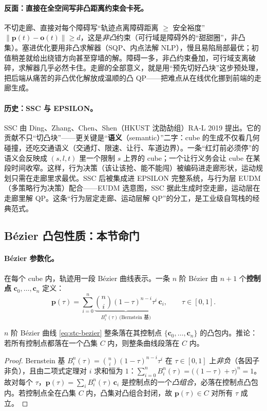 \paragraph{反面：直接在全空间写非凸距离约束会卡死。}
不切走廊、直接对每个障碍写“轨迹点离障碍距离 $\ge$ 安全裕度” $\|\mathbf{p}(t)-\mathbf{o}(t)\|\ge d$，这是\emph{非凸}约束（可行域是障碍外的“甜甜圈”，非凸集）。塞进优化要用非凸求解器（SQP、内点法解 NLP），慢且易陷局部最优；初值稍差就给出绕错方向甚至穿墙的解。障碍一多，非凸约束叠加，可行域支离破碎，求解器几乎必然卡住。走廊的全部意义，就是用“预先切好凸块”这步预处理，把后端从痛苦的非凸优化解放成温顺的凸 QP——把难点从在线优化挪到前端的走廊生成。

\paragraph{历史：SSC 与 EPSILON。}
SSC 由 Ding、Zhang、Chen、Shen（HKUST 沈劭劼组）RA-L 2019 提出\cite{ding2019ssc}。它的贡献不只“切凸块”——更关键是“\textbf{语义}（semantic）”二字：cube 的生成不仅看几何碰撞，还吃交通语义（交通灯、限速、让行、车道边界）。一条“红灯前必须停”的语义会反映成 $(s,l,t)$ 里一个限制 $s$ 上界的 cube；一个让行义务会让 cube 在某段时间收窄。这样，行为决策（该让该抢、能不能闯）被编码进走廊形状，运动规划只需在走廊里求最优。SSC 后被集成进 EPSILON 完整系统，与行为层 EUDM（多策略行为决策）配合——EUDM 选意图，SSC 据此生成时空走廊，运动层在走廊里解 QP。这条“行为层定走廊、运动层解 QP”的分工，是工业级自驾栈的经典范式。

\subsection{Bézier 凸包性质：本节命门}
\label{sec:stc-bezier}

\paragraph{Bézier 参数化。}
在每个 cube 内，轨迹用一段 Bézier 曲线表示。一条 $n$ 阶 Bézier 由 $n+1$ 个\textbf{控制点} $\mathbf{c}_0,\dots,\mathbf{c}_n$ 定义：
\begin{equation}
  \mathbf{p}(\tau)=\sum_{i=0}^{n}\underbrace{\binom{n}{i}(1-\tau)^{n-i}\tau^{i}}_{B_i^n(\tau)\ \text{(Bernstein 基)}}\,\mathbf{c}_i,\qquad \tau\in[0,1].
  \label{eq:stc-bezier}
\end{equation}

\begin{theorem}\label{thm:stc-convexhull}
$n$ 阶 Bézier 曲线 \cref{eq:stc-bezier} 整条落在其控制点 $\{\mathbf{c}_0,\dots,\mathbf{c}_n\}$ 的凸包内。推论：若所有控制点都落在一个凸集 $C$ 内，则整条曲线段落在 $C$ 内。
\end{theorem}
\begin{proof}
Bernstein 基 $B_i^n(\tau)=\binom{n}{i}(1-\tau)^{n-i}\tau^i$ 在 $\tau\in[0,1]$ 上\emph{非负}（各因子非负），且由二项式定理对 $i$ 求和恒为 $1$：$\sum_{i=0}^n B_i^n(\tau)=\big((1-\tau)+\tau\big)^n=1$。故对每个 $\tau$，$\mathbf{p}(\tau)=\sum_i B_i^n(\tau)\,\mathbf{c}_i$ 是控制点的一个\emph{凸组合}，必落在控制点凸包内。若控制点全在凸集 $C$ 内，凸集对凸组合封闭，故 $\mathbf{p}(\tau)\in C$ 对所有 $\tau$ 成立。
\end{proof}

